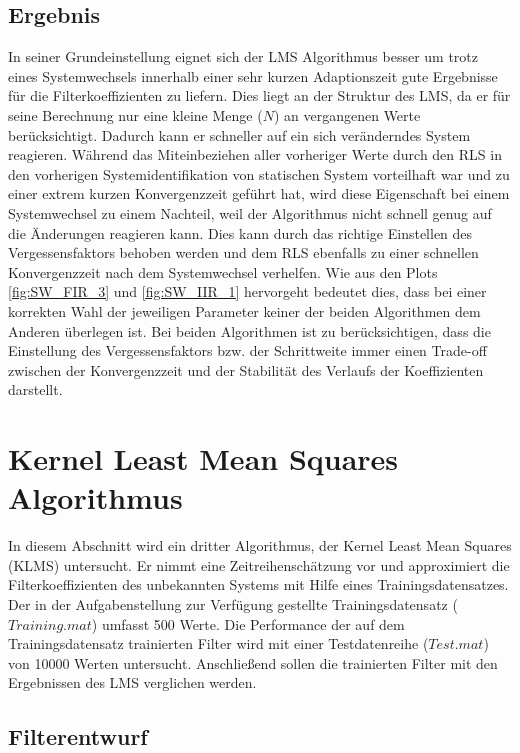 \subsection{Ergebnis}

In seiner Grundeinstellung eignet sich der LMS Algorithmus besser um trotz eines Systemwechsels innerhalb einer sehr kurzen Adaptionszeit gute Ergebnisse für die Filterkoeffizienten zu liefern.
Dies liegt an der Struktur des LMS, da er für seine Berechnung nur eine kleine Menge ($N$) an vergangenen Werte berücksichtigt.
Dadurch kann er schneller auf ein sich veränderndes System reagieren.
Während das Miteinbeziehen aller vorheriger Werte durch den RLS in den vorherigen Systemidentifikation von statischen System vorteilhaft war und zu einer extrem kurzen Konvergenzzeit geführt hat, wird diese Eigenschaft bei einem Systemwechsel zu einem Nachteil, weil der Algorithmus nicht schnell genug auf die Änderungen reagieren kann.
Dies kann durch das richtige Einstellen des Vergessensfaktors behoben werden und dem RLS ebenfalls zu einer schnellen Konvergenzzeit nach dem Systemwechsel verhelfen.
Wie aus den Plots \ref{fig:SW_FIR_3} und \ref{fig:SW_IIR_1} hervorgeht bedeutet dies, dass bei einer korrekten Wahl der jeweiligen Parameter keiner der beiden Algorithmen dem Anderen überlegen ist.
Bei beiden Algorithmen ist zu berücksichtigen, dass die Einstellung des Vergessensfaktors bzw. der Schrittweite immer einen Trade-off zwischen der Konvergenzzeit und der Stabilität des Verlaufs der Koeffizienten darstellt.





\section{Kernel Least Mean Squares Algorithmus}
\label{sec:klms}

In diesem Abschnitt wird ein dritter Algorithmus, der Kernel Least Mean Squares (KLMS) untersucht.
Er nimmt eine Zeitreihenschätzung vor und approximiert die Filterkoeffizienten des unbekannten Systems mit Hilfe eines Trainingsdatensatzes.
Der in der Aufgabenstellung zur Verfügung gestellte Trainingsdatensatz ($Training.mat$) umfasst 500 Werte.
Die Performance der auf dem Trainingsdatensatz trainierten Filter wird mit einer Testdatenreihe ($Test.mat$) von 10000 Werten untersucht.
Anschließend sollen die trainierten Filter mit den Ergebnissen des LMS verglichen werden.


\subsection{Filterentwurf}


